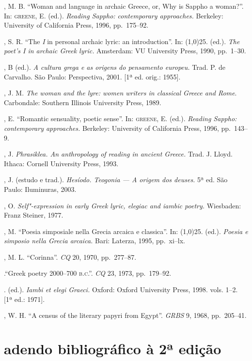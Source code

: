 \begin{bibliohedra}
, M. B. “Woman and language in archaic Greece, or, Why is Sappho
a woman?”. In: \textsc{greene}, E. (ed.). \textit{Reading Sappho: contemporary
approaches.} Berkeley: University of California Press, 1996, pp.~175--92.

, S. R. “The \textit{I} in personal archaic lyric: an
introduction”. In: \line(1,0){25}. (ed.). \textit{The poet’s I in archaic Greek
lyric.} Amsterdam: VU University Press, 1990, pp.~1--30.

, B (ed.). \textit{A cultura grega e as origens do pensamento
europeu.} Trad. P. de Carvalho. São Paulo: Perspectiva, 2001. [1ª ed. orig.:
1955].

, J. M. \textit{The woman and the lyre: women writers in
classical Greece and Rome}. Carbondale: Southern Illinois University Press,
1989.

, E. “Romantic sensuality, poetic sense”. In: \textsc{greene}, E.
(ed.). \textit{Reading Sappho: contemporary approaches.} Berkeley: University
of California Press, 1996, pp.~143--9.

, J. \textit{Phrasiklea. An anthropology of reading in ancient
Greece.} Trad. J. Lloyd. Ithaca: Cornell University Press, 1993.

, J. (estudo e trad.). \textit{Hesíodo. Teogonia --- A origem dos
deuses.} 5ª ed. São Paulo: Iluminuras, 2003.

, O. \textit{Self"-expression in early Greek lyric, elegiac
and iambic poetry.} Wiesbaden: Franz Steiner, 1977.

, M. “Poesia simposiale nella Grecia arcaica e classica”. In:
\line(1,0){25}. (ed.). \textit{Poesia e simposio nella Grecia arcaica.}
Bari: Laterza, 1995, pp.~xi--lx.

, M. L. “Corinna”. \textit{CQ} 20, 1970, pp.~277--87.

\titidem.“Greek poetry 2000--700 \textsc{b.c.”.} \textit{CQ} 23, 1973,
pp.~179--92.

\titidem. (ed.). \textit{Iambi et elegi Graeci.} Oxford: Oxford University
Press, 1998. vols. 1--2. [1ª ed.: 1971].

, W. H. “A census of the literary papyri from Egypt”.
\textit{GRBS} 9, 1968, pp.~205--41.


\pagebreak

\section*{adendo bibliográfico à 2ª edição}



\end{bibliohedra}
